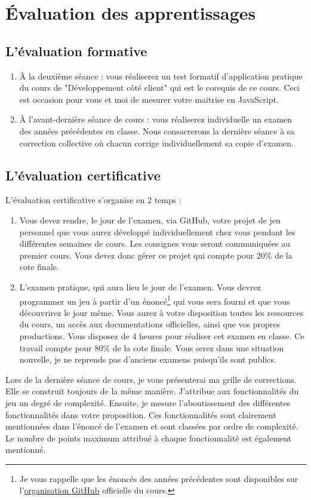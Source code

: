 \section{Évaluation des apprentissages}
\subsection{L’évaluation formative}
\label{eval_formative}
\begin{enumerate}
    \item À la deuxième séance : vous réaliserez un test formatif d’application pratique du cours de "Développement côté client" qui est le corequis de ce cours. Ceci est occasion pour vous et moi de mesurer votre maitrise en JavaScript.
    \item À l'avant-dernière séance de cours : vous réaliserez individuelle un examen des années précédentes en classe. Nous consacrerons la dernière séance à sa correction collective où chacun corrige individuellement sa copie d'examen.
\end{enumerate}

\subsection{L’évaluation certificative}

L’évaluation certificative s'organise en 2 temps :
\begin{enumerate}
    \item Vous devez rendre, le jour de l'examen, via GitHub, votre projet de jeu personnel que vous aurez développé individuellement chez vous pendant les différentes semaines de cours. Les consignes vous seront communiquées au premier cours. Vous devez donc gérer ce projet qui compte pour 20\% de la cote finale.
    \item L'examen pratique, qui aura lieu le jour de l'examen. Vous devrez programmer un jeu à partir d'un énoncé\footnote{Je vous rappelle que les énoncés des années précédentes sont disponibles sur l'\href{https://github.com/tecg-mmi}{organisation GitHub} officielle du cours.} qui vous sera fourni et que vous découvrirez le jour même. Vous aurez à votre disposition toutes les ressources du cours, un accès aux documentations officielles, ainsi que vos propres productions. Vous disposez de 4 heures pour réaliser cet examen en classe. Ce travail compte pour 80\% de la cote finale. Vous serez dans une situation nouvelle, je ne reprends pas d'anciens examens puisqu'ils sont publics.
\end{enumerate}
Lors de la dernière séance de cours, je vous présenterai ma grille de corrections. Elle se construit toujours de la même manière. J'attribue aux fonctionnalités du jeu un degré de complexité. Ensuite, je mesure l'aboutissement des différentes fonctionnalités dans votre proposition. Ces fonctionnalités sont clairement mentionnées dans l'énoncé de l'examen et sont classées par ordre de complexité. Le nombre de points maximum attribué à chaque fonctionnalité est également mentionné.


